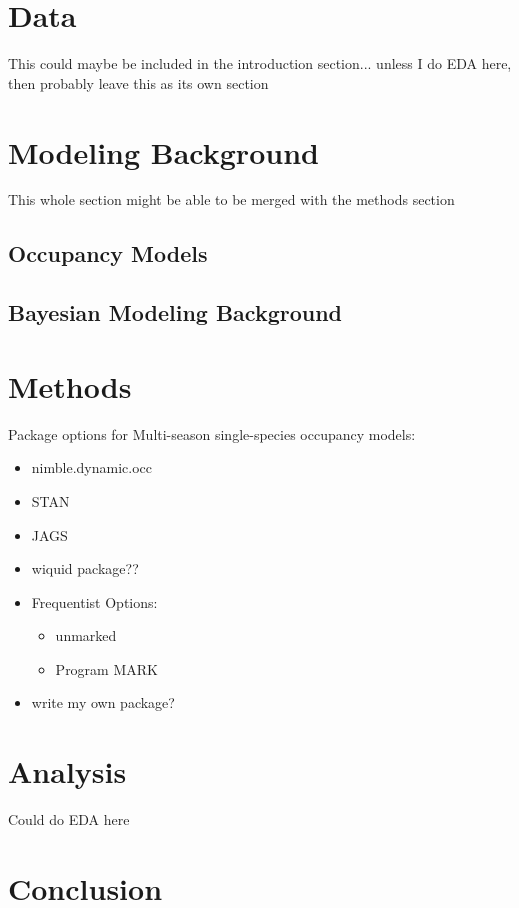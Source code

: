 \documentclass[12pt]{article}\usepackage[]{graphicx}\usepackage[]{color}
\begin{document}
\section{Data}

This could maybe be included in the introduction section... unless I do EDA here, then probably leave this as its own section



\section{Modeling Background}

This whole section might be able to be merged with the methods section 

\subsection{Occupancy Models}
 
\subsection{Bayesian Modeling Background}

\section{Methods}

Package options for Multi-season single-species occupancy models: 
\begin{itemize}
\item nimble.dynamic.occ
\item STAN
\item JAGS
\item wiquid package??
\item Frequentist Options: 
  \begin{itemize}
  \item unmarked
  \item Program MARK
  \end{itemize}
\item write my own package? 
\end{itemize}

\section{Analysis}

Could do EDA here

\section{Conclusion}
\end{document}
